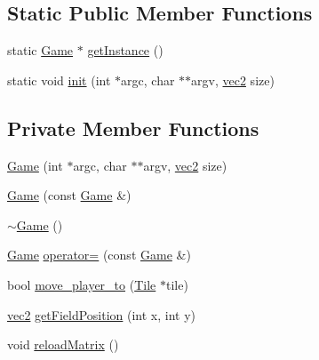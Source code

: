 \subsection*{Static Public Member Functions}
\begin{DoxyCompactItemize}
\item 
static \hyperlink{classGame}{Game} $\ast$ \hyperlink{classGame_a19798a4f4c50037e1c5cd8c5d491fef9}{get\+Instance} ()
\item 
static void \hyperlink{classGame_a512ae0e27fd506ed300d975ed3a18f73}{init} (int $\ast$argc, char $\ast$$\ast$argv, \hyperlink{structvec2}{vec2} size)
\end{DoxyCompactItemize}
\subsection*{Private Member Functions}
\begin{DoxyCompactItemize}
\item 
\hyperlink{classGame_a9d6d7d14009e53d647a16ff1523d8639}{Game} (int $\ast$argc, char $\ast$$\ast$argv, \hyperlink{structvec2}{vec2} size)
\item 
\hyperlink{classGame_aa79443880de5f26387c2a1c70c8c1aae}{Game} (const \hyperlink{classGame}{Game} \&)
\item 
\hyperlink{classGame_ae3d112ca6e0e55150d2fdbc704474530}{$\sim$\+Game} ()
\item 
\hyperlink{classGame}{Game} \hyperlink{classGame_ad49ec11a59d863479784cac379ea47f1}{operator=} (const \hyperlink{classGame}{Game} \&)
\item 
bool \hyperlink{classGame_aae6b9f31b51dfd44e23d3d9aa18f7fe8}{move\+\_\+player\+\_\+to} (\hyperlink{classTile}{Tile} $\ast$tile)
\item 
\hyperlink{structvec2}{vec2} \hyperlink{classGame_a1946c2dd23aadfed4d91944f862294e8}{get\+Field\+Position} (int x, int y)
\item 
void \hyperlink{classGame_ad85b7db122d5d99f7a37021dbecd938a}{reload\+Matrix} ()
\end{DoxyCompactItemize}
